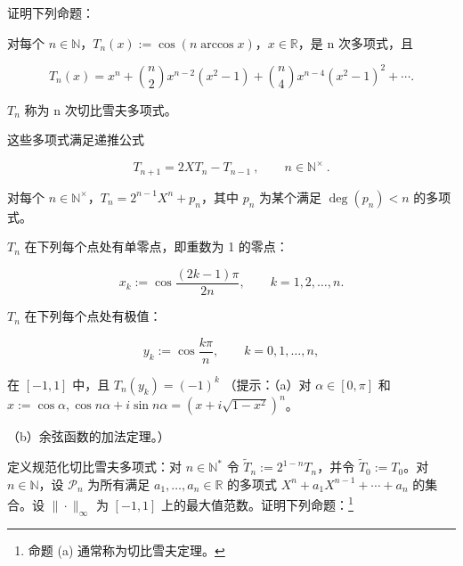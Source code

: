 \begin{exercises}
\item[12.]

证明下列命题：

\begin{items}
\item

对每个 $ n \in \mathbb{N} $，$ T_n(x) := \cos(n \arccos x) $，$ x \in \mathbb{R} $，是 n 次多项式，且

\[
T_{n}(x)=x^{n}+\binom{n}{2}x^{n-2}(x^{2}-1)+\binom{n}{4}x^{n-4}(x^{2}-1)^{2}+\cdots.
\]

$ T_{n} $ 称为 n 次切比雪夫多项式。

\item

这些多项式满足递推公式

\[
T_{n+1}=2X T_{n}-T_{n-1}~,\qquad n\in\mathbb{N}^{\times}~.
\]
\item

对每个 $ n \in \mathbb{N}^\times $，$ T_n = 2^{n-1}X^n + p_n $，其中 $ p_n $ 为某个满足 $ \deg(p_n) < n $ 的多项式。

\item

$ T_{n} $ 在下列每个点处有单零点，即重数为 1 的零点：

\[
x_{k}:=\cos\frac{(2k-1)\pi}{2n},\qquad k=1,2,\ldots,n.
\]
\item

$ T_{n} $ 在下列每个点处有极值：

\[
y_{k}:=\cos\frac{k\pi}{n},\qquad k=0,1,\ldots,n,
\]

在 $ [-1,1] $ 中，且 $ T_{n}(y_{k})=(-1)^{k} $
（提示：（a）对 $ \alpha\in[0,\pi] $ 和 $ x:=\cos\alpha,\cos n\alpha+i\sin n\alpha=\left(x+i\sqrt{1-x^{2}}\right)^{n} $。

\end{items}

（b）余弦函数的加法定理。）

\item[13.]

定义规范化切比雪夫多项式：对 $ n \in \mathbb{N}^* $ 令 $ \tilde{T}_n := 2^{1-n}T_n $，并令 $ \tilde{T}_0 := T_0 $。对 $ n \in \mathbb{N} $，设 $ \mathcal{P}_n $ 为所有满足 $ a_1, \ldots, a_n \in \mathbb{R} $ 的多项式 $ X^n + a_1X^{n-1} + \cdots + a_n $ 的集合。设 $ \|\cdot\|_\infty $ 为 $ [-1,1] $ 上的最大值范数。证明下列命题：\footnote{命题 (a) 通常称为切比雪夫定理。}

\begin{items}
\item


\end{items}
\end{exercises}
